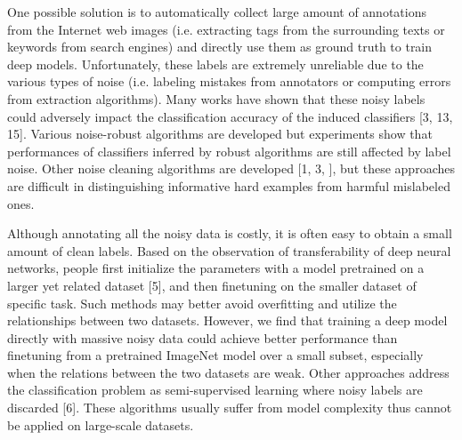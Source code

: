 \documentclass[10pt,twocolumn,letterpaper]{article}
\begin{document}
One possible solution is to automatically collect large amount of annotations from the Internet web images (i.e. extracting tags from the surrounding texts or keywords from search engines) and directly use them as ground truth to train deep models. Unfortunately, these labels are extremely unreliable due to the various types of noise (i.e. labeling mistakes from annotators or computing errors from extraction algorithms). Many works have shown that these noisy labels could adversely impact the classification accuracy of the induced classifiers [3, 13, 15]. Various noise-robust algorithms are developed but experiments show that performances of classifiers inferred by robust algorithms are still affected by label noise. Other noise cleaning algorithms are developed [1, 3, ], but these approaches are difficult in distinguishing informative hard examples from harmful mislabeled ones. 

Although annotating all the noisy data is costly, it is often easy to obtain a small amount of clean labels. Based on the observation of transferability of deep neural networks, people first initialize the parameters with a model pretrained on a larger yet related dataset [5], and then finetuning on the smaller dataset of specific task. Such methods may better avoid overfitting and utilize the relationships between two datasets. However, we find that training a deep model directly with massive noisy data could achieve better performance than finetuning from a pretrained ImageNet model over a small subset, especially when the relations between the two datasets are weak. Other approaches address the classification problem as semi-supervised learning where noisy labels are discarded [6]. These algorithms usually suffer from model complexity thus cannot be applied on large-scale datasets. 
\end{document}
